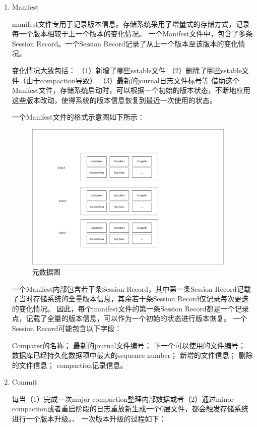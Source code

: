 		\begin{enumerate}
		
		\item Manifest

manifest文件专用于记录版本信息。存储系统采用了增量式的存储方式，记录每一个版本相较于上一个版本的变化情况。
一个Manifest文件中，包含了多条Session Record。一个Session Record记录了从上一个版本至该版本的变化情况。

变化情况大致包括：
（1）新增了哪些sstable文件
（2）删除了哪些sstable文件（由于compaction导致）
（3）最新的journal日志文件标号等
借助这个Manifest文件，存储系统启动时，可以根据一个初始的版本状态，不断地应用这些版本改动，使得系统的版本信息恢复到最近一次使用的状态。

一个Manifest文件的格式示意图如下所示：
			
\begin{figure}[H]
	\centering
	\includegraphics[width=0.95\textwidth]{pdf/manifest.pdf}
	\caption{元数据图}
	\label{manifest}
\end{figure}
			

一个Manifest内部包含若干条Session Record，其中第一条Session Record记载了当时存储系统的全量版本信息，其余若干条Session Record仅记录每次更迭的变化情况。
因此，每个manifest文件的第一条Session Record都是一个记录点，记载了全量的版本信息，可以作为一个初始的状态进行版本恢复。
一个Session Record可能包含以下字段：

Comparer的名称；
最新的journal文件编号；
下一个可以使用的文件编号；
数据库已经持久化数据项中最大的sequence number；
新增的文件信息；
删除的文件信息；
compaction记录信息。
		\item Commit

每当（1）完成一次major compaction整理内部数据或者（2）通过minor compaction或者重启阶段的日志重放新生成一个0层文件，都会触发存储系统进行一个版本升级。、
一次版本升级的过程如下：
		

\end{enumerate}
